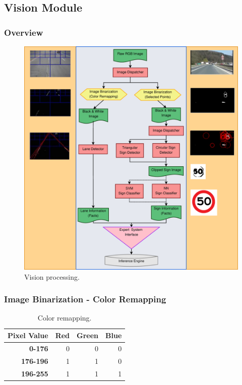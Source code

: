 \documentclass{beamer}
\begin{document}
\subsection{Vision Module}
\frame
{
  \frametitle{Overview}
  \begin{figure}[ht]
	\begin{center}
	\includegraphics[height=.6\paperheight]{../img/vision.eps}
	\caption{Vision processing.}
	\label{fig:vision}
	\end{center}
	\end{figure}
}

\frame
{
  \frametitle{Image Binarization - Color Remapping}
	\begin{table}
	\caption{Color remapping.}
	\centering
	{\footnotesize
	\begin{tabular}{|r|r|r|r|}
	\hline
	{\bf Pixel Value} & {\bf Red} & {\bf Green} & {\bf Blue} \\
	\hline
	{\bf 0-176} & 0 & 0 & 0 \\
	\hline
	{\bf 176-196} & 1 & 1 & 0 \\
	\hline
	{\bf 196-255} & 1 & 1 & 1 \\
	\hline
	\end{tabular}  }  
	\label{tabldtable2}
	\end{table}
	\par
}
\end{document}
